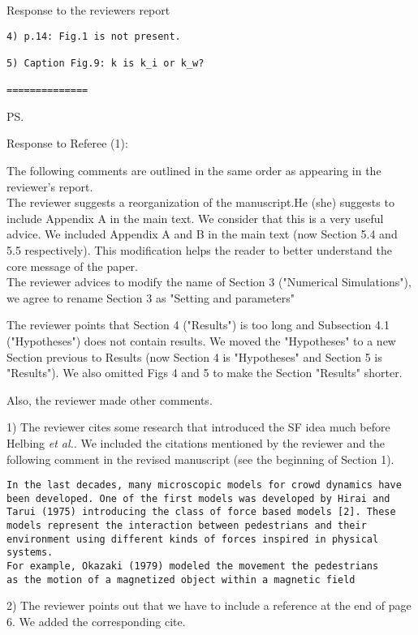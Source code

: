 \documentclass[a4paper,12pt]{letter}
\begin{document}
\begin{letter}{Response to the reviewers report}
\begin{verbatim}
4) p.14: Fig.1 is not present.

5) Caption Fig.9: k is k_i or k_w?

==============
\end{verbatim}


\ps{Response to Referee (1): 

The following comments are outlined in the same order as appearing in the
reviewer’s report. \\

The reviewer suggests a reorganization of the manuscript.He (she) suggests to include Appendix A in the main text.
We consider that this is a very useful advice. 
We included Appendix A and B in the main text (now Section 5.4 and 5.5 respectively). 
This modification helps the reader to better understand the core message of the paper. \\ 

The reviewer advices to modify the name of Section 3 ("Numerical Simulations"), we agree to rename 
Section 3 as "Setting and parameters"

The reviewer points that Section 4 ("Results") is too long and Subsection 4.1 ("Hypotheses")
does not contain results.  We moved the "Hypotheses" to a new Section previous to Results 
(now Section 4 is "Hypotheses" and Section 5 is "Results"). We also omitted Figs 4 and 5 to make
the Section "Results" shorter. 

Also, the reviewer made other comments.

1) The reviewer cites some research that introduced the SF idea much before 
Helbing \textit{et al.}. We included the citations mentioned by the reviewer 
and the following comment in the revised manuscript (see the beginning of Section 1). 

\begin{verbatim}
In the last decades, many microscopic models for crowd dynamics have
been developed. One of the first models was developed by Hirai and 
Tarui (1975) introducing the class of force based models [2]. These
models represent the interaction between pedestrians and their 
environment using different kinds of forces inspired in physical systems.
For example, Okazaki (1979) modeled the movement the pedestrians 
as the motion of a magnetized object within a magnetic field
\end{verbatim}

2) The reviewer points out that we have to include a reference at the end of 
page 6. We added the corresponding cite. \\

}
\end{letter}
\end{document}
